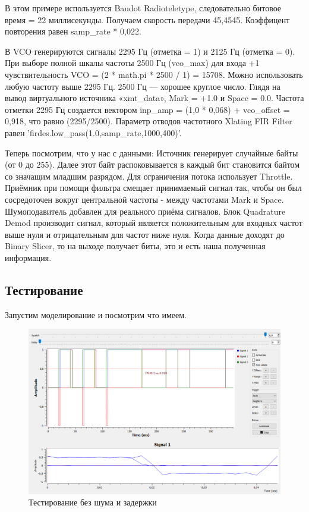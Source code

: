 В этом примере используется Baudot Radioteletype, следовательно битовое время = 22 миллисекунды. Получаем скорость передачи 45,4545.
Коэффицент повторения равен samp\_rate * 0,022.

В VCO генерируются сигналы 2295 Гц (отметка = 1) и 2125 Гц (отметка = 0). При выборе полной шкалы частоты 2500 Гц (vco\_max) для входа +1 чувствительность VCO = (2 * math.pi * 2500 / 1) = 15708. Можно использовать любую частоту выше 2295 Гц. 2500 Гц — хорошее круглое число. Глядя на вывод виртуального источника «xmt\_data», Mark = +1.0 и Space = 0.0. Частота отметки 2295 Гц создается вектором inp\_amp = (1,0 * 0,068) + vco\_offset = 0,918, что равно (2295/2500). Параметр отводов частотного Xlating FIR Filter равен 'firdes.low\_pass(1.0,samp\_rate,1000,400)'.

Теперь посмотрим, что у нас с данными:
\quad Источник генерирует случайные байты (от 0 до 255). Далее этот байт распоковывается в каждый бит становится байтом со значащим младшим разрядом. Для ограничения потока использует Throttle.
\quad Приёмник при помощи фильтра смещает принимаемый сигнал так, чтобы он был сосредоточен вокруг центральной частоты - между частотами Mark и Space. Шумоподавитель добавлен для реального приёма сигналов. Блок Quadrature Demod производит сигнал, который является положительным для входных частот выше нуля и отрицательным для частот ниже нуля. Когда данные доходят до Binary Slicer, то на выходе получает биты, это и есть наша полученная информация.
\subsection{Тестирование}
Запустим моделирование и посмотрим что имеем.

    \begin{figure}[H]
	\begin{center}
		\includegraphics[scale=0.4]{fig/lab12/e1.png}
		\caption{Тестирование без шума и задержки}
		\label{pic:e1} %
	\end{center}
\end{figure}

